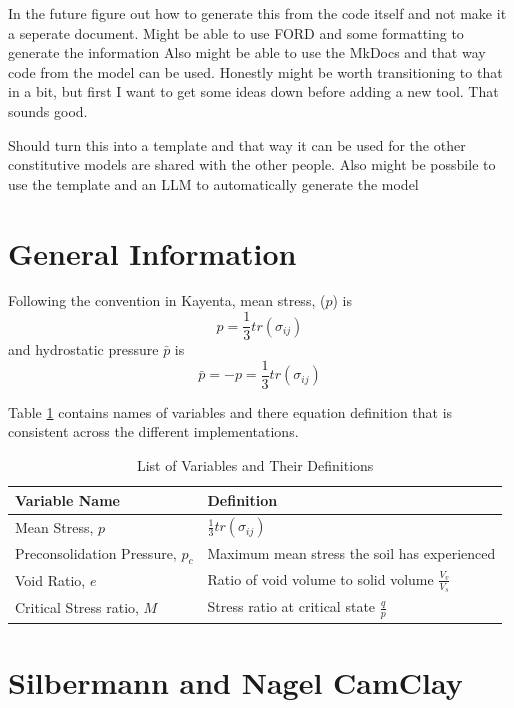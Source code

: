 \documentclass[a4paper,12pt]{article}
\begin{document}
In the future figure out how to generate this from the code itself and not make it a seperate document. 
    Might be able to use FORD and some formatting to generate the information
    Also might be able to use the MkDocs and that way code from the model can be used. Honestly might be worth transitioning to that in a bit, but first I want to get some ideas down before adding a new tool. That sounds good.

Should turn this into a template and that way it can be used for the other constitutive models are shared with the other people. Also might be possbile to use the template and an LLM to automatically generate the model

\section{General Information}

Following the convention in Kayenta, mean stress, ($p$) is
\begin{equation}
    p = \frac{1}{3}tr(\sigma_{ij})
\end{equation}
%
and hydrostatic pressure $\bar{p}$ is
\begin{equation}
    \bar{p} = -p = \frac{1}{3}tr(\sigma_{ij})  
\end{equation} 

Table \ref{tab:variable_info} contains names of variables and there equation definition that is consistent across the different implementations.
\begin{table}[ht]
    \centering
    \begin{tabular}{|l|l|}
        \hline
        \textbf{Variable Name} & \textbf{Definition} \\
        \hline
        Mean Stress, $p$                   & $\frac{1}{3}tr(\sigma_{ij})$ \\
        Preconsolidation Pressure, $p_{c}$ & Maximum mean stress the soil has experienced \\
        Void Ratio, $e$                    & Ratio of void volume to solid volume $\frac{V_{v}}{V_{s}}$ \\
        Critical Stress ratio, $M$         & Stress ratio at critical state $\frac{q}{p}$ \\
        \hline
    \end{tabular}
    \caption{List of Variables and Their Definitions}
    \label{tab:variable_info}
\end{table}

\section{Silbermann and Nagel CamClay}
\end{document}
